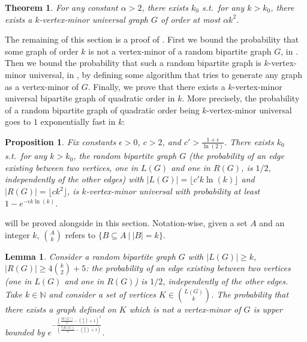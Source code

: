 \documentclass[10pt,a4paper]{article}
\newtheorem{theorem}{Theorem}[section]
\newtheorem{lemma}{Lemma}[section]
\newtheorem{proposition}{Proposition}[section]
\newcommand{\se}{\subseteq}
\newcommand{\gs}{\geqslant}
\begin{document}
\begin{theorem}
    For any constant $\alpha>2$, there exists $k_0$ s.t.~for any $k>k_0$, there exists a $k$-vertex-minor universal graph $G$ of order at most $\alpha k^2$.
    \label{thm:existence_vmu}
\end{theorem}

The remaining of this section is a proof of . First we bound the probability that some graph of order $k$ is not a vertex-minor of a random bipartite graph $G$, in . Then we bound the probability that such a random bipartite graph is $k$-vertex-minor universal, in , by defining some algorithm that tries to generate any graph as a vertex-minor of $G$. Finally, we prove that there exists a $k$-vertex-minor universal bipartite graph of quadratic order in $k$. More precisely, the probability of a random bipartite graph of quadratic order being $k$-vertex-minor universal goes to $1$ exponentially fast in $k$:

\begin{proposition}
    Fix constants $\epsilon > 0$, $c>2$, and $c'>  \frac{1+\epsilon}{\ln(2)}$. There exists $k_0$ s.t.~for any $k>k_0$, the random bipartite graph $G$ (the probability of an edge existing between two vertices, one in $L(G)$ and one in $R(G)$, is $1/2$, independently of the other edges) with $|L(G)|= \lfloor c'k\ln(k) \rfloor$ and $|R(G)| = \lfloor c k^2 \rfloor$, is $k$-vertex-minor universal with probability at least $1 - e^{-\epsilon k \ln(k)}$. 
    \label{prop:proba_exp_vmu}
\end{proposition}

 will be proved alongside  in this section. Notation-wise, given a set $A$ and an integer $k$, ${A \choose k}$ refers to $\{B \se A ~|~|B|=k\}$.

\begin{lemma}
    \label{lemma:proba_full_rank}
    Consider a random bipartite graph $G$ with $|L(G)|\gs k$, $|R(G)| \gs 4{k \choose 2}+5$: the probability of an edge existing between two vertices (one in $L(G)$ and one in $R(G)$) is $1/2$, independently of the other edges. Take $k \in \mathbb{N}$ and consider a set of vertices $K \in {L(G) \choose k}$. The probability that there exists a graph defined on $K$ which is not a vertex-minor of $G$ is upper bounded by $e^{-\frac{\left(\frac{|R(G)|}{4}-{k \choose 2}+1\right)^2}{\left(\frac{7|R(G)|}{4}-{k \choose 2}+1\right)}}$.
\end{lemma}
\end{document}
